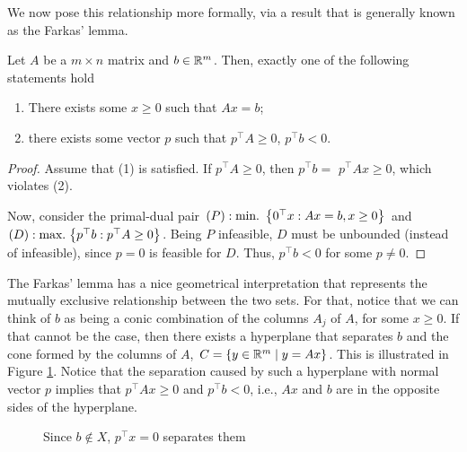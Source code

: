 We now pose this relationship more formally, via a result that is generally known as the Farkas' lemma.

\begin{theorem} \label{p1c6:thm:farkas}
	Let $A$ be a $m \times n$ matrix and $b \in \mathbb{R}^m$. Then, exactly one of the following statements hold
	\begin{enumerate}
		\item There exists some $x \geq 0$ such that $Ax = b$;
		\item there exists some vector $p$ such that $p^\top A \geq 0$, $p^\top b < 0$. 
	\end{enumerate}
\end{theorem}

\begin{proof}
	Assume that (1) is satisfied. If $p^\top A \geq 0$, then $p^\top b =$ $p^\top Ax \geq 0$, which violates (2).
	
	Now, consider the primal-dual pair $(P) : \mathop{\text{min.~}}\left\{ 0^\top x : Ax = b, x \geq 0 \right \}$ and $(D) : \mathop{\text{max.~}}\hspace{-2pt}\left\{ p^\top b : p^\top A \geq 0 \right \}$. Being $P$ infeasible, $D$ must be unbounded (instead of infeasible), since $p = 0$ is feasible for $D$. Thus, $p^\top b < 0$ for some $p \neq 0$. 	
\end{proof}

The Farkas' lemma has a nice geometrical interpretation that represents the mutually exclusive relationship between the two sets. For that, notice that we can think of $b$ as being a conic combination of the columns $A_j$ of $A$, for some $x \ge 0$. If that cannot be the case, then there exists a hyperplane that separates $b$ and the cone formed by the columns of $A$, $C=\left\{ y \in \mathbb{R}^m \mid y = Ax \right \}$. This is illustrated in Figure \ref{p1c6:fig:farkas}. Notice that the separation caused by such a hyperplane with normal vector $p$ implies that $p^\top Ax \geq 0$ and $p^\top b < 0$, i.e., $Ax$ and $b$ are in the opposite sides of the hyperplane. 

\begin{figure}[h]
	\caption{Since $b \not\in X$, $p^\top x=0$ separates them} \label{p1c6:fig:farkas}	
\end{figure}


